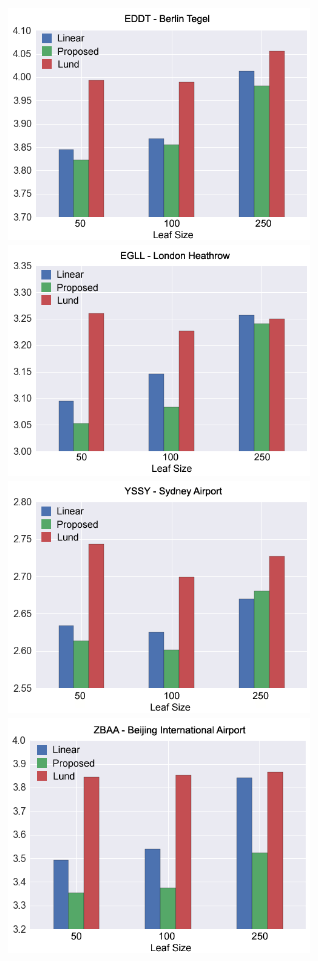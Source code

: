 \documentclass[times,twocolumn,final,authoryear]{elsarticle}
\begin{document}
\begin{figure}
  \includegraphics[width=8cm]{berlin.png}
  \includegraphics[width=8cm]{heathrow.png}
  \includegraphics[width=8cm]{sydney.png}
  \includegraphics[width=8cm]{beijing.png}

\end{figure}
\end{document}
